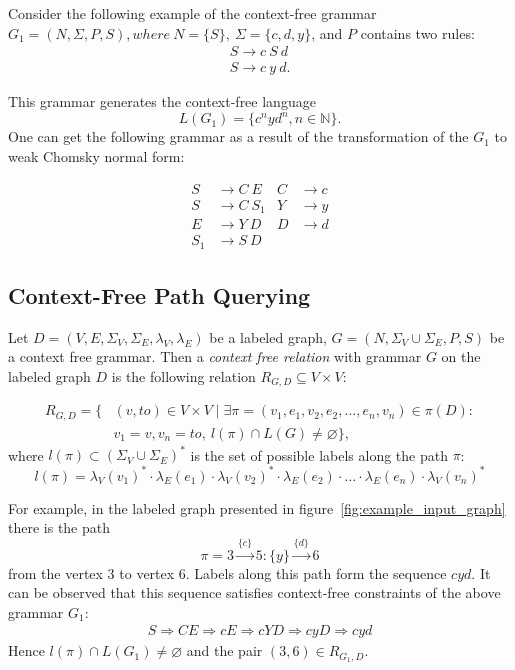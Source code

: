 Consider the following example of the context-free grammar $G_1=(N, \Sigma, P, S), where ~N=\{S\},~\Sigma=\{c, d, y\}$, and $P$ contains two rules: 
\begin{align*}
S \rightarrow c \ S \ d\\
S \rightarrow c \ y \ d.
\end{align*}

This grammar generates the context-free language $$L(G_1) = \{c^nyd^n, n \in \mathbb{N}\}.$$
One can get the following grammar as a result of the transformation of the $G_1$ to weak Chomsky normal form:

\begin{align*}
S& \to C \ E   & C& \to c   \\
S& \to C \ S_1 & Y& \to y   \\
E& \to Y \ D   & D& \to d   \\ 
S_1& \to S \ D &&
\end{align*}


\subsection{Context-Free Path Querying}

\begin{definition}
Let $D = (V, E, \Sigma_V, \Sigma_E, \lambda_V, \lambda_E)$ be a labeled graph, $G = (N, \Sigma_V \cup \Sigma_E, P, S)$ be a context free grammar. Then a \emph{context free relation} with grammar $G$ on the labeled graph $D$ is the following relation $R_{G, D} \subseteq V \times V$:

\begin{equation*} \label{eq1}
\begin{split}
R_{G, D} = \{&(v, to) \in V \times V \mid \exists \pi = (v_1, e_1, v_2, e_2, \ldots, e_n, v_n) \in \pi(D): \\
      &v_1 = v, v_n = to,~l(\pi) \cap L(G) \neq \varnothing \},
\end{split}
\end{equation*}
where $l(\pi) \subset (\Sigma_V \cup \Sigma_E)^*$ is the set of possible labels along the path $\pi$:
$$l(\pi) = \lambda_V(v_1)^* \cdot \lambda_E(e_1) \cdot \lambda_V(v_2)^* \cdot \lambda_E(e_2) \cdot \ldots \cdot \lambda_E(e_n) \cdot \lambda_V(v_n)^*$$

For example, in the labeled graph presented in figure~\ref{fig:example_input_graph} there is the path $$\pi=3 \xrightarrow{\{c\}} 5:\{y\} \xrightarrow{\{d\}} 6$$ from the vertex 3 to vertex 6.
Labels along this path form the sequence $cyd$.
It can be observed that this sequence satisfies context-free constraints of the above grammar $G_1$:
    \begin{align*}
         S \Rightarrow CE \Rightarrow cE \Rightarrow cYD \Rightarrow cyD \Rightarrow cyd
    \end{align*}
    Hence $l(\pi) \cap L(G_1) \neq \varnothing$ and the pair $(3,6) \in R_{G_1, D}$.

\end{definition}

